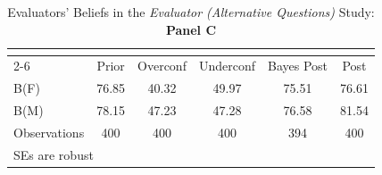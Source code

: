 \begin{table}[htbp]\centering
\caption{Evaluators' Beliefs in the \textit{Evaluator (Alternative Questions)} Study: \textbf{Panel C}}
\begin{tabular}{l*{5}{c}}
\hline\hline
                &\multicolumn{5}{c}{}                             \\\cmidrule(lr){2-6}
                &\multicolumn{1}{c}{Prior}&\multicolumn{1}{c}{Overconf}&\multicolumn{1}{c}{Underconf}&\multicolumn{1}{c}{Bayes Post}&\multicolumn{1}{c}{Post}\\
\hline
B(F)            &    76.85&    40.32&    49.97&    75.51&    76.61\\
B(M)            &    78.15&    47.23&    47.28&    76.58&    81.54\\
\hline
Observations    &      400&      400&      400&      394&      400\\
\hline\hline
\multicolumn{6}{l}{\footnotesize SEs are robust}\\
\end{tabular}
\end{table}

